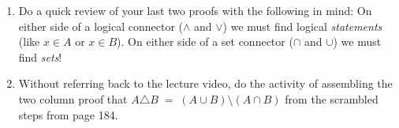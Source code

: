 \documentclass{amsart}
\begin{document}
\begin{enumerate}
\begin{proof}
We need to show that $x \in (A \cup B) \cup C) \; \iff \; x \in A \cup (B \cup C)$.  Suppose $A$, $B$ and $C$ are sets and $x$ is a particular but arbitrary element of
the universe of discourse.
\begin{align*}
 &      & x \in (A \cup B) \cup C \rule{48pt}{0pt} & \mbox{Given} & \\
 & \iff & x \in (A \cup B) \lor x \in C \rule{48pt}{0pt}  & \mbox{Definition of union} & \\
 & \iff & (x \in A \lor x \in B) \lor x \in C \rule{48pt}{0pt}  & \mbox{Definition of union} & \\
 & \iff & x \in A \lor (x \in B \lor x \in C) \rule{48pt}{0pt}  & \mbox{Associative property of disjunction} & 
 & \iff & x \in A \lor (x \in B \cup C) \rule{48pt}{0pt}  & \mbox{Definition of union} & \\
  & \iff & x \in A \cup (B \cup C) \rule{48pt}{0pt}  & \mbox{Definition of union} & 
\end{align*}
\end{proof}

Now you try one! Prove the distributive law of union over intersection.

\vfill


\newpage
\item Do a quick review of your last two proofs with the following in mind:  On either side of a logical connector ($\land$ and $\lor$) we must find logical {\em statements} (like $x \in A$ or $x \in B$).  On either side of a set connector ($\cap$ and $\cup$) we must find {\em sets}!  

\vfill

\item Without referring back to the lecture video, do the activity of assembling the two column proof that
$A \triangle B \; = \; (A \cup B) \setminus (A \cap B)$ from the scrambled steps from page 184.

\vfill


\end{enumerate}
\end{document}
